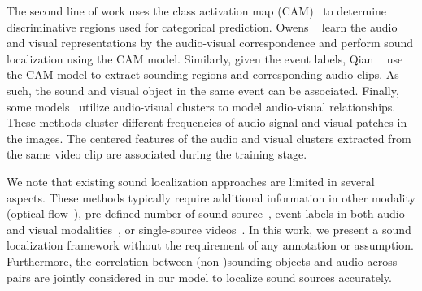 %
The second line of work uses the class activation map (CAM)~\cite{cvpr16_CAM} to determine discriminative regions used for categorical prediction.
%
Owens \etal~\cite{av_eccv18_Owens} learn the audio and visual representations by the audio-visual correspondence and perform sound localization using the CAM model. 
% 
Similarly, given the event labels, Qian \etal~\cite{av_eccv20_mms_loc} use the CAM model to extract sounding regions and corresponding audio clips.
%
As such, the sound and visual object in the same event can be associated.
%
Finally, some models~\cite{av_cvpr19_deep_cluster,av_arxiv_curricumlum_av_clutser} utilize audio-visual clusters to model audio-visual relationships.
%
These methods cluster different frequencies of audio signal and visual patches in the images.
%
The centered features of the audio and visual clusters extracted from the same video clip are associated during the training stage.


We note that existing sound localization approaches are limited in several aspects. 
%
These methods typically require additional information in other modality (\eg optical flow~\cite{av_eccv20_objs_vids}), pre-defined number of sound source~\cite{av_cvpr19_deep_cluster,av_arxiv_curricumlum_av_clutser}, event labels in both audio and visual modalities~\cite{av_eccv20_mms_loc}, or single-source videos~\cite{av_nips20_loc}. 
%
In this work, we present a sound localization framework without the requirement of any annotation or assumption. 
%
Furthermore, the correlation between (non-)sounding objects and audio across pairs are jointly considered in our model to localize sound sources accurately. 

